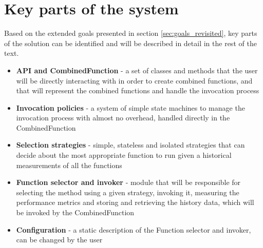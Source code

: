 \section{Key parts of the system}

Based on the extended goals presented in section \ref{sec:goals_revisited}, key parts of the solution can be identified and will be described in detail in the rest of the text.

\begin{itemize}
	\item \textbf{API and CombinedFunction} - a set of classes and methods that the user will be directly interacting with in order to create combined functions, and that will represent the combined functions and handle the invocation process
	\item \textbf{Invocation policies} - a system of simple state machines to manage the invocation process with almost no overhead, handled directly in the CombinedFunction
	\item \textbf{Selection strategies} - simple, stateless and isolated strategies that can decide about the most appropriate function to run given a historical measurements of all the functions
	\item \textbf{Function selector and invoker} - module that will be responsible for selecting the method using a given strategy, invoking it, measuring the performance metrics and storing and retrieving the history data, which will be invoked by the CombinedFunction
	\item \textbf{Configuration} - a static description of the Function selector and invoker, can be changed by the user
\end{itemize}